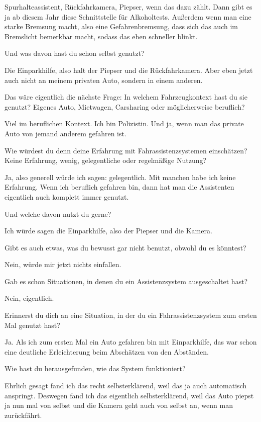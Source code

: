 Spurhalteassistent, Rückfahrkamera, Piepser, wenn das dazu zählt. Dann
gibt es ja ab diesem Jahr diese Schnittstelle für Alkoholtests.
Außerdem wenn man eine starke Bremsung macht, also eine Gefahrenbremsung,
dass sich das auch im Bremslicht bemerkbar macht, sodass das eben
schneller blinkt.

\interviewerin
Und was davon hast du schon selbst genutzt?

Die Einparkhilfe, also halt der Piepser und die Rückfahrkamera. Aber eben
jetzt auch nicht an meinem privaten Auto, sondern in einem anderen.

\interviewerin
Das wäre eigentlich die nächste Frage: In welchem Fahrzeugkontext hast
du sie genutzt? Eigenes Auto, Mietwagen, Carsharing oder möglicherweise
beruflich?

Viel im beruflichen Kontext. Ich bin Polizistin. Und ja, wenn man das
private Auto von jemand anderem gefahren ist.

\interviewerin
Wie würdest du denn deine Erfahrung mit Fahrassistenzsystemen
einschätzen? Keine Erfahrung, wenig, gelegentliche oder regelmäßige
Nutzung?

Ja, also generell würde ich sagen: gelegentlich. Mit manchen habe ich
keine Erfahrung. Wenn ich beruflich gefahren bin, dann hat man die
Assistenten eigentlich auch komplett immer genutzt.

\interviewerin
Und welche davon nutzt du gerne?

Ich würde sagen die Einparkhilfe, also der Piepser und die Kamera.

\interviewerin
Gibt es auch etwas, was du bewusst gar nicht benutzt, obwohl du es
könntest?

Nein, würde mir jetzt nichts einfallen.

\interviewerin
Gab es schon Situationen, in denen du ein Assistenzsystem ausgeschaltet
hast?

Nein, eigentlich.

\interviewerin
Erinnerst du dich an eine Situation, in der du ein Fahrassistenzsystem
zum ersten Mal genutzt hast?

Ja. Als ich zum ersten Mal ein Auto gefahren bin mit Einparkhilfe, das
war schon eine deutliche Erleichterung beim Abschätzen von den Abständen.

\interviewerin
Wie hast du herausgefunden, wie das System funktioniert?

Ehrlich gesagt fand ich das recht selbsterklärend, weil das ja auch
automatisch anspringt. Deswegen fand ich das eigentlich selbsterklärend,
weil das Auto piepst ja nun mal von selbst und die Kamera geht auch von
selbst an, wenn man zurückfährt.

